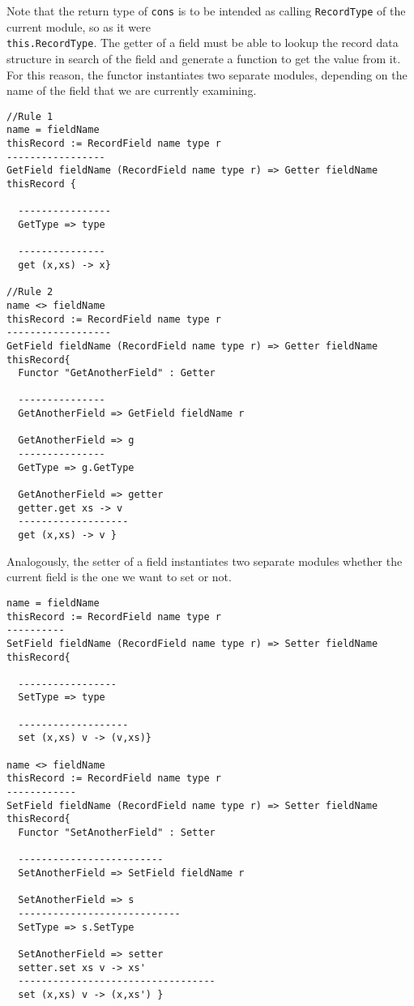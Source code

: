 \noindent
Note that the return type of \texttt{cons} is to be intended as calling \texttt{RecordType} of the current module, so as it were \\ \texttt{this.RecordType}.
The getter of a field must be able to lookup the record data structure in search of the field and generate a function to get the value from it. For this reason, the functor instantiates two separate modules, depending on the name of the field that we are currently examining.

\begin{lstlisting}[caption = Module instantiations for getters, label = code:getters]
//Rule 1
name = fieldName
thisRecord := RecordField name type r
-----------------
GetField fieldName (RecordField name type r) => Getter fieldName thisRecord {

  ----------------
  GetType => type
  
  ---------------
  get (x,xs) -> x}

//Rule 2
name <> fieldName
thisRecord := RecordField name type r
------------------
GetField fieldName (RecordField name type r) => Getter fieldName thisRecord{
  Functor "GetAnotherField" : Getter
  
  ---------------
  GetAnotherField => GetField fieldName r
  
  GetAnotherField => g
  ---------------
  GetType => g.GetType
  
  GetAnotherField => getter
  getter.get xs -> v
  -------------------
  get (x,xs) -> v }
\end{lstlisting}

\noindent
Analogously, the setter of a field instantiates two separate modules whether the current field is the one we want to set or not.

\begin{lstlisting}[caption = Module instantiations for setters, label = code:setters]
name = fieldName
thisRecord := RecordField name type r
----------
SetField fieldName (RecordField name type r) => Setter fieldName thisRecord{
  
  -----------------
  SetType => type
  
  -------------------
  set (x,xs) v -> (v,xs)}

name <> fieldName
thisRecord := RecordField name type r
------------
SetField fieldName (RecordField name type r) => Setter fieldName thisRecord{
  Functor "SetAnotherField" : Setter
  
  -------------------------
  SetAnotherField => SetField fieldName r
  
  SetAnotherField => s
  ----------------------------
  SetType => s.SetType
  
  SetAnotherField => setter
  setter.set xs v -> xs'
  ----------------------------------
  set (x,xs) v -> (x,xs') }
\end{lstlisting}

